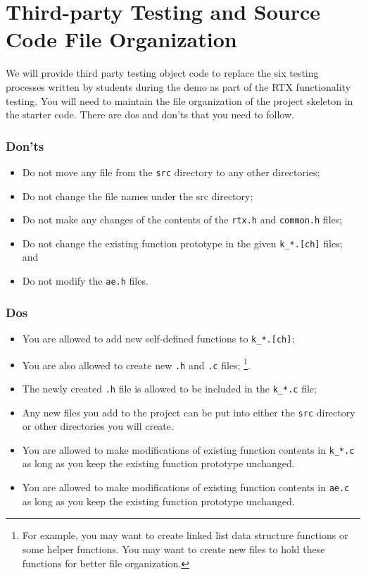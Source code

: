 \section{Third-party Testing and Source Code File Organization}
\label{sec_ae}
    We will provide third party testing object code to replace the six testing processes written by students during the demo as part of the RTX functionality testing.
    You will need to maintain the file organization of the project skeleton in the starter code.  
    There are dos and don'ts that you need to follow.
    \subsubsection*{Don'ts} 
      \begin{itemize}
        \item Do not move any file from the \verb+src+ directory to any other directories;
        \item Do not change the file names under the src directory;
        \item Do not make any changes of the contents of the \verb+rtx.h+ and \verb+common.h+ files;
        \item Do not change the existing function prototype in the given \verb+k_*.[ch]+ files; and
        \item Do not modify the \verb+ae.h+ files.
      \end{itemize}
    \subsubsection*{Dos}
      \begin{itemize}
        \item You are allowed to add new self-defined functions to \verb+k_*.[ch]+;
        \item You are also allowed to create new \verb+.h+ and \verb+.c+ files;
          \footnote{For example, you may want to create linked list data structure functions or some helper functions. You may want to create new files to hold these functions for better file organization.}.
        \item The newly created \verb+.h+ file is allowed to be included in the \verb+k_*.c+ file;
        \item Any new files you add to the project can be put into either the \verb+src+ directory or other directories you will create.
        \item {You are allowed to make modifications of existing function contents in \verb+k_*.c+ as long as you keep the existing function prototype unchanged.}
        \item {You are allowed to make modifications of existing function contents in \verb+ae.c+ as long as you keep the existing function prototype unchanged.}
      \end{itemize}

